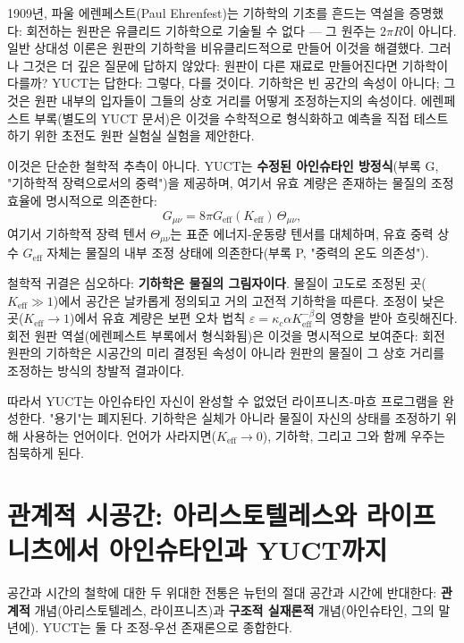 \documentclass[12pt,a4paper]{article}
\begin{document}
	1909년, 파울 에렌페스트(Paul Ehrenfest)는 기하학의 기초를 흔드는 역설을 증명했다: 회전하는 원판은 유클리드 기하학으로 기술될 수 없다 — 그 원주는 \(2\pi R\)이 아니다. 일반 상대성 이론은 원판의 기하학을 비유클리드적으로 만들어 이것을 해결했다. 그러나 그것은 더 깊은 질문에 답하지 않았다: 원판이 다른 재료로 만들어진다면 기하학이 다를까? YUCT는 답한다: 그렇다, 다를 것이다. 기하학은 빈 공간의 속성이 아니다; 그것은 원판 내부의 입자들이 그들의 상호 거리를 어떻게 조정하는지의 속성이다. 에렌페스트 부록(별도의 YUCT 문서)은 이것을 수학적으로 형식화하고 예측을 직접 테스트하기 위한 초전도 원판 실험실 실험을 제안한다.
	
	이것은 단순한 철학적 추측이 아니다. YUCT는 \textbf{수정된 아인슈타인 방정식}(부록 G, "기하학적 장력으로서의 중력")을 제공하며, 여기서 유효 계량은 존재하는 물질의 조정 효율에 명시적으로 의존한다:
	\[
	G_{\mu\nu} = 8\pi G_{\mathrm{eff}}(K_{\mathrm{eff}}) \, \Theta_{\mu\nu},
	\]
	여기서 기하학적 장력 텐서 \(\Theta_{\mu\nu}\)는 표준 에너지-운동량 텐서를 대체하며, 유효 중력 상수 \(G_{\mathrm{eff}}\) 자체는 물질의 내부 조정 상태에 의존한다(부록 P, "중력의 온도 의존성").
	
	철학적 귀결은 심오하다: \textbf{기하학은 물질의 그림자이다}. 물질이 고도로 조정된 곳(\(K_{\mathrm{eff}} \gg 1\))에서 공간은 날카롭게 정의되고 거의 고전적 기하학을 따른다. 조정이 낮은 곳(\(K_{\mathrm{eff}} \to 1\))에서 유효 계량은 보편 오차 법칙 \(\varepsilon = \kappa_c \alpha K_{\mathrm{eff}}^{-\beta}\)의 영향을 받아 흐릿해진다. 회전 원판 역설(에렌페스트 부록에서 형식화됨)은 이것을 명시적으로 보여준다: 회전 원판의 기하학은 시공간의 미리 결정된 속성이 아니라 원판의 물질이 그 상호 거리를 조정하는 방식의 창발적 결과이다.
	
	따라서 YUCT는 아인슈타인 자신이 완성할 수 없었던 라이프니츠-마흐 프로그램을 완성한다. "용기"는 폐지된다. 기하학은 실체가 아니라 물질이 자신의 상태를 조정하기 위해 사용하는 언어이다. 언어가 사라지면(\(K_{\mathrm{eff}} \to 0\)), 기하학, 그리고 그와 함께 우주는 침묵하게 된다.
	
	\section{관계적 시공간: 아리스토텔레스와 라이프니츠에서 아인슈타인과 YUCT까지}
	
	공간과 시간의 철학에 대한 두 위대한 전통은 뉴턴의 절대 공간과 시간에 반대한다: \textbf{관계적} 개념(아리스토텔레스, 라이프니츠)과 \textbf{구조적 실재론적} 개념(아인슈타인, 그의 말년에). YUCT는 둘 다 조정-우선 존재론으로 종합한다.
	
\end{document}
